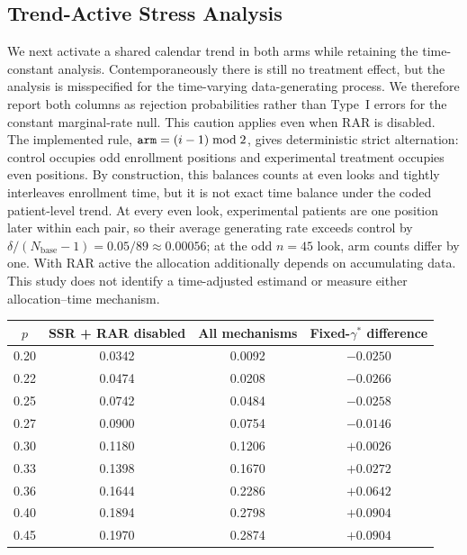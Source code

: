 \documentclass[11pt]{article}
\begin{document}
\subsection{Trend-Active Stress Analysis}
\label{sec:trend-active}

We next activate a shared calendar trend in both arms while retaining the
time-constant analysis.  Contemporaneously there is still no treatment effect,
but the analysis is misspecified for the time-varying data-generating process.
We therefore report both columns as rejection probabilities rather than Type~I
errors for the constant marginal-rate null.  This caution applies even when RAR
is disabled.  The implemented rule, ${\tt arm}=(i-1)\bmod 2$, gives
deterministic strict alternation: control occupies odd enrollment positions and
experimental treatment occupies even positions.  By construction, this balances
counts at even looks and tightly interleaves enrollment time, but it is not exact
time balance under the coded patient-level trend.  At every even look, experimental patients
are one position later within each pair, so their average generating rate
exceeds control by $\delta/(N_{\mathrm{base}}-1)=0.05/89\approx0.00056$; at the
odd $n=45$ look, arm counts differ by one.  With RAR active the allocation
additionally depends on accumulating data.  This study does not identify a
time-adjusted estimand or measure either allocation--time mechanism.

\begin{center}
\begin{tabular}{cccc}
\toprule
$p$ & SSR + RAR disabled & All mechanisms & Fixed-$\gamma^*$ difference \\
\midrule
0.20 & 0.0342 & 0.0092 & $-0.0250$ \\
0.22 & 0.0474 & 0.0208 & $-0.0266$ \\
0.25 & 0.0742 & 0.0484 & $-0.0258$ \\
0.27 & 0.0900 & 0.0754 & $-0.0146$ \\
0.30 & 0.1180 & 0.1206 & $+0.0026$ \\
0.33 & 0.1398 & 0.1670 & $+0.0272$ \\
0.36 & 0.1644 & 0.2286 & $+0.0642$ \\
0.40 & 0.1894 & 0.2798 & $+0.0904$ \\
0.45 & 0.1970 & 0.2874 & $+0.0904$ \\
\bottomrule
\end{tabular}
\end{center}
\end{document}
